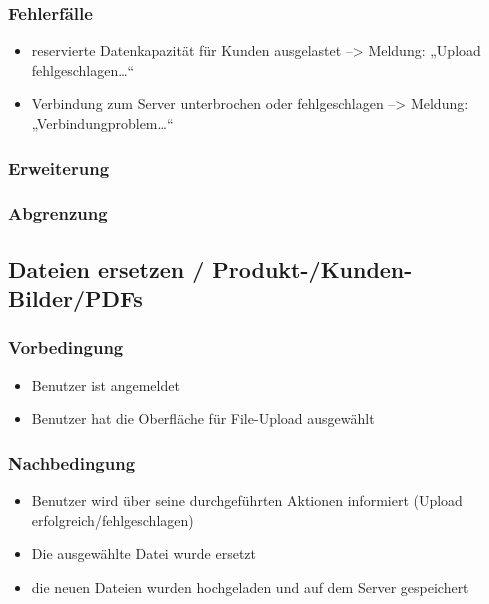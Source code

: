 \documentclass[a4paper,12pt]{article}
\begin{document}
\subsubsection{Fehlerfälle}\label{fehlerfalle-11}

\begin{itemize}

\item
  reservierte Datenkapazität für Kunden ausgelastet --\textgreater{}
  Meldung: „Upload fehlgeschlagen\ldots{}``
\item
  Verbindung zum Server unterbrochen oder fehlgeschlagen
  --\textgreater{} Meldung: „Verbindungproblem\ldots{}``
\end{itemize}

\subsubsection{Erweiterung}\label{erweiterung-11}

\subsubsection{Abgrenzung}\label{abgrenzung-11}

\subsection{Dateien ersetzen / Produkt-/Kunden- Bilder/PDFs}\label{dateien-ersetzen-produkt-kunden--bilderpdfs}

\subsubsection{Vorbedingung}\label{vorbedingung-12}

\begin{itemize}

\item
  Benutzer ist angemeldet
\item
  Benutzer hat die Oberfläche für File-Upload ausgewählt
\end{itemize}

\subsubsection{Nachbedingung}\label{nachbedingung-12}

\begin{itemize}

\item
  Benutzer wird über seine durchgeführten Aktionen informiert (Upload
  erfolgreich/fehlgeschlagen)
\item
  Die ausgewählte Datei wurde ersetzt
\item
  die neuen Dateien wurden hochgeladen und auf dem Server gespeichert
\end{itemize}
\end{document}
